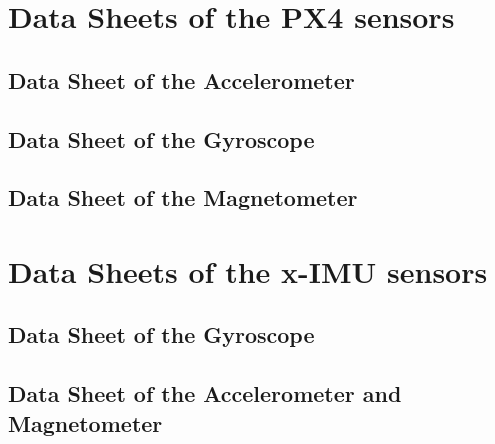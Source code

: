 \chapter{Data Sheets of the PX4 sensors}\label{ds}
\section{Data Sheet of the Accelerometer}\label{ds_acc}

\section{Data Sheet of the Gyroscope}\label{ds_gyro}

\section{Data Sheet of the Magnetometer}\label{ds_mag}

\chapter{Data Sheets of the x-IMU sensors}\label{ds_ximu}
\section{Data Sheet of the Gyroscope}

\section{Data Sheet of the Accelerometer and Magnetometer}


